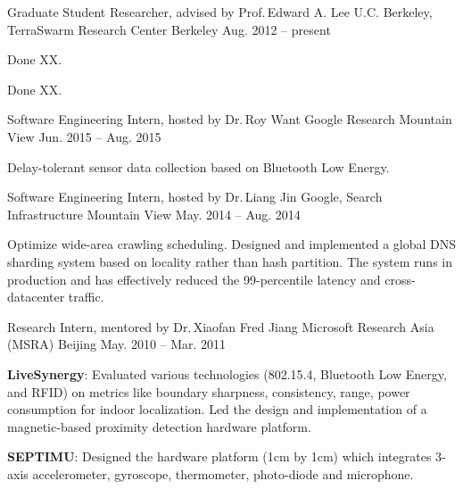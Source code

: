 
\begin{cventries}

  \cventry
  {Graduate Student Researcher, advised by Prof.\,Edward A. Lee}
  {U.C. Berkeley, TerraSwarm Research Center}
  {Berkeley}
  {Aug. 2012 -- present}
  {
    \begin{cvitems}
    \item {Done XX.}
    \item {Done XX.}
    \end{cvitems}
  }

  \cventry
  {Software Engineering Intern, hosted by Dr.\,Roy Want}
  {Google Research}
  {Mountain View}
  {Jun. 2015 -- Aug. 2015}
  {
    \begin{cvitems}
      Delay-tolerant sensor data collection based on Bluetooth Low Energy.
    \end{cvitems}
  }

  \cventry
  {Software Engineering Intern, hosted by Dr.\,Liang Jin}
  {Google, Search Infrastructure}
  {Mountain View}
  {May. 2014 -- Aug. 2014}
  {
    \begin{cvitems}
      Optimize wide-area crawling scheduling. Designed and implemented a global
      DNS sharding system based on locality rather than hash partition. The
      system runs in production and has effectively reduced the 99-percentile
      latency and cross-datacenter traffic.
    \end{cvitems}
  }

  \cventry
  {Research Intern, mentored by Dr.\,Xiaofan Fred Jiang}
  {Microsoft Research Asia (MSRA)}
  {Beijing}
  {May. 2010 -- Mar. 2011}
  {
    \begin{cvitems}
      \item \textbf{LiveSynergy}: Evaluated various technologies (802.15.4, Bluetooth
      Low Energy, and RFID) on metrics like boundary sharpness, consistency,
      range, power consumption for indoor localization. Led the design and
      implementation of a magnetic-based proximity detection hardware platform.
      \item \textbf{SEPTIMU}: Designed the hardware platform (1cm by 1cm) which
      integrates 3-axis accelerometer, gyroscope, thermometer, photo-diode and
      microphone.
    \end{cvitems}
  }
  
\end{cventries}

